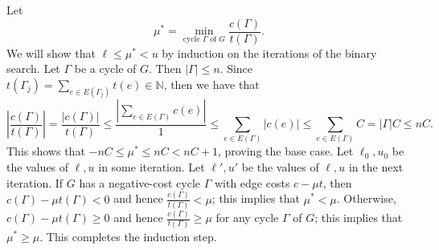 \documentclass[letterpaper,reqno,12pt]{article}
\newcommand{\NN}{\mathbb{N}}
\begin{document}
\begin{exercise}
\begin{enumerate}
    Let
    $$ \mu^* = \min_\text{cycle $\Gamma$ of $G$} \frac{c(\Gamma)}{t(\Gamma)}. $$
    We will show that $\ell \leq \mu^* < u$ by induction on the iterations of the binary search. Let $\Gamma$ be a cycle of $G$. Then $|\Gamma| \leq n$. Since $t(\Gamma_j) = \sum_{e \in E(\Gamma_j)} t(e) \in \NN$, then we have that
    \begin{equation} \label{eq:time-cost-ratio-initial-bound}
      \left|\frac{c(\Gamma)}{t(\Gamma)}\right| = \frac{|c(\Gamma)|}{t(\Gamma)} \leq \frac{\left|\sum_{e \in E(\Gamma)} c(e)\right|}{1} \leq \sum_{e \in E(\Gamma)} |c(e)| \leq \sum_{e \in E(\Gamma)} C = |\Gamma| C \leq nC.
    \end{equation}
    This shows that $-nC \leq \mu^* \leq nC < nC + 1$, proving the base case. Let $\ell_0, u_0$ be the values of $\ell, u$ in some iteration. Let $\ell', u'$ be the values of $\ell, u$ in the next iteration. If $G$ has a negative-cost cycle $\Gamma$ with edge costs $c - \mu t$, then $c(\Gamma) - \mu t(\Gamma) < 0$ and hence $\frac{c(\Gamma)}{t(\Gamma)} < \mu$; this implies that $\mu^* < \mu$. Otherwise, $c(\Gamma) - \mu t(\Gamma) \geq 0$ and hence $\frac{c(\Gamma)}{t(\Gamma)} \geq \mu$ for any cycle $\Gamma$ of $G$; this implies that $\mu^* \geq \mu$. This completes the induction step.


\end{enumerate}
\end{exercise}
\end{document}
